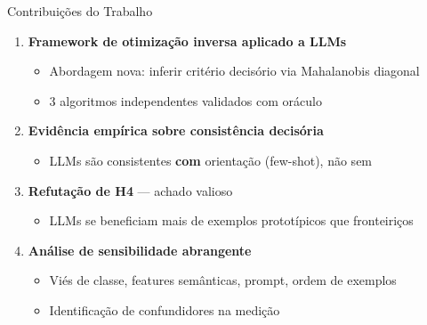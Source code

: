 \documentclass[aspectratio=169,12pt]{beamer}
\begin{document}
\begin{frame}{Contribuições do Trabalho}
\begin{enumerate}
    \item \textbf{Framework de otimização inversa aplicado a LLMs}
    \begin{itemize}
        \item Abordagem nova: inferir critério decisório via Mahalanobis diagonal
        \item 3 algoritmos independentes validados com oráculo
    \end{itemize}

    \item \textbf{Evidência empírica sobre consistência decisória}
    \begin{itemize}
        \item LLMs são consistentes \textbf{com} orientação (few-shot), não sem
    \end{itemize}

    \item \textbf{Refutação de H4} --- achado valioso
    \begin{itemize}
        \item LLMs se beneficiam mais de exemplos prototípicos que fronteiriços
    \end{itemize}

    \item \textbf{Análise de sensibilidade abrangente}
    \begin{itemize}
        \item Viés de classe, features semânticas, prompt, ordem de exemplos
        \item Identificação de confundidores na medição
    \end{itemize}
\end{enumerate}
\end{frame}
\end{document}
